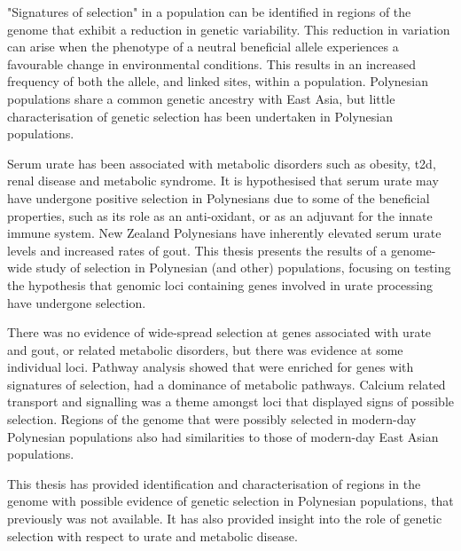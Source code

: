 "Signatures of selection" in a population can be identified in regions of the genome that exhibit a reduction in genetic variability. This reduction in variation can arise when the phenotype of a neutral beneficial allele experiences a favourable change in environmental conditions. This results in an increased frequency of both the allele, and linked sites, within a population. Polynesian populations share a common genetic ancestry with East Asia, but little characterisation of genetic selection has been undertaken in Polynesian populations.

Serum urate has been associated with metabolic disorders such as obesity, \gls{t2d}, renal disease and metabolic syndrome. It is hypothesised that serum urate may have undergone positive selection in Polynesians due to some of the beneficial properties, such as its role as an anti-oxidant, or as an adjuvant for the innate immune system. New Zealand Polynesians have inherently elevated serum urate levels and increased rates of gout. This thesis presents the results of a genome-wide study of selection in Polynesian (and other) populations, focusing on testing the hypothesis that genomic loci containing genes involved in urate processing have undergone selection.

There was no evidence of wide-spread selection at genes associated with urate and gout, or related metabolic disorders, but there was evidence at some individual loci. Pathway analysis showed that were enriched for genes with signatures of selection, had a dominance of metabolic pathways. Calcium related transport and signalling was a theme amongst loci that displayed signs of possible selection. Regions of the genome that were possibly selected in modern-day Polynesian populations also had similarities to those of modern-day East Asian populations.

This thesis has provided identification and characterisation of regions in the genome with possible evidence of genetic selection in Polynesian populations, that previously was not available. It has also provided insight into the role of genetic selection with respect to urate and metabolic disease.
